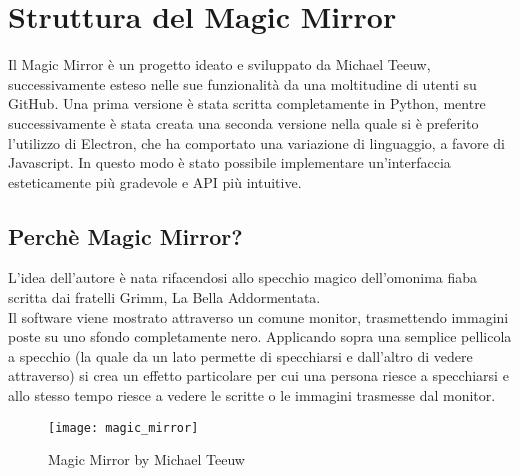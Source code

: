 \chapter{Struttura del Magic Mirror}

Il Magic Mirror \`e un progetto ideato e sviluppato da Michael Teeuw, successivamente esteso nelle sue funzionalit\`a da una moltitudine di utenti su GitHub.
Una prima versione \`e stata scritta completamente in Python, mentre successivamente \`e stata creata una seconda versione nella quale si \`e preferito l'utilizzo di Electron,
che ha comportato una variazione di linguaggio, a favore di Javascript. In questo modo \`e stato possibile implementare un'interfaccia esteticamente pi\`u gradevole
e API pi\`u intuitive.
\\[2\baselineskip]

\section{Perch\`e Magic Mirror?}
L'idea dell'autore \`e nata rifacendosi allo specchio magico dell'omonima fiaba
scritta dai fratelli Grimm, La Bella Addormentata.\\
Il software viene mostrato attraverso un
comune monitor, trasmettendo immagini poste su uno sfondo completamente nero. Applicando sopra
una semplice pellicola a specchio (la quale da un lato permette di specchiarsi e dall'altro di vedere
attraverso) si crea un effetto particolare per cui una persona riesce a specchiarsi
e allo stesso tempo riesce a vedere le scritte o le immagini trasmesse dal monitor.
\\[2\baselineskip]
\begin{figure}[H]
    \texttt{[image: magic\_mirror]}
    \caption{Magic Mirror by Michael Teeuw}
\end{figure}

